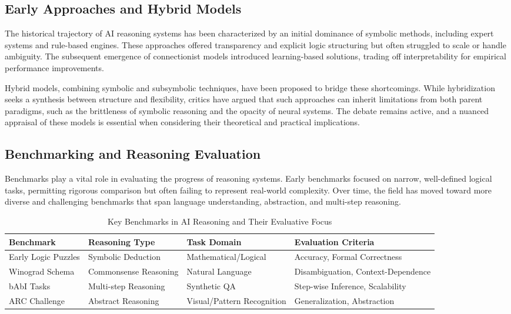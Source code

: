 \documentclass[sigconf]{acmart}
\begin{document}
\subsection{Early Approaches and Hybrid Models}
The historical trajectory of AI reasoning systems has been characterized by an initial dominance of symbolic methods, including expert systems and rule-based engines. These approaches offered transparency and explicit logic structuring but often struggled to scale or handle ambiguity. The subsequent emergence of connectionist models introduced learning-based solutions, trading off interpretability for empirical performance improvements.

Hybrid models, combining symbolic and subsymbolic techniques, have been proposed to bridge these shortcomings. While hybridization seeks a synthesis between structure and flexibility, critics have argued that such approaches can inherit limitations from both parent paradigms, such as the brittleness of symbolic reasoning and the opacity of neural systems. The debate remains active, and a nuanced appraisal of these models is essential when considering their theoretical and practical implications.

\subsection{Benchmarking and Reasoning Evaluation}
Benchmarks play a vital role in evaluating the progress of reasoning systems. Early benchmarks focused on narrow, well-defined logical tasks, permitting rigorous comparison but often failing to represent real-world complexity. Over time, the field has moved toward more diverse and challenging benchmarks that span language understanding, abstraction, and multi-step reasoning.

\begin{table*}[htbp]
\centering
\caption{Key Benchmarks in AI Reasoning and Their Evaluative Focus}
\label{tab:benchmarks}
\begin{adjustbox}{max width=\textwidth}
\begin{tabular}{@{}llll@{}}
\toprule
Benchmark & Reasoning Type & Task Domain & Evaluation Criteria \\
\midrule
Early Logic Puzzles & Symbolic Deduction & Mathematical/Logical & Accuracy, Formal Correctness \\
Winograd Schema & Commonsense Reasoning & Natural Language & Disambiguation, Context-Dependence \\
bAbI Tasks & Multi-step Reasoning & Synthetic QA & Step-wise Inference, Scalability \\
ARC Challenge & Abstract Reasoning & Visual/Pattern Recognition & Generalization, Abstraction \\
\bottomrule
\end{tabular}
\end{adjustbox}
\end{table*}
\end{document}

